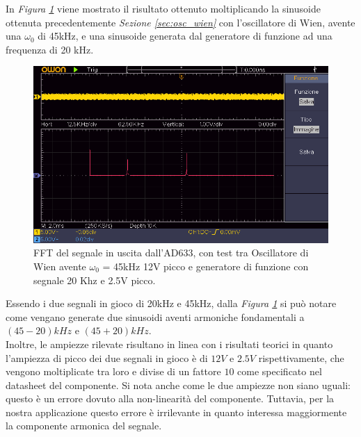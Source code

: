 \documentclass[titlepage]{report}
\begin{document}
	\noindent In \textit{Figura \ref{fig:FFTmixer}} viene mostrato il risultato ottenuto moltiplicando la sinusoide ottenuta precedentemente \textit{Sezione \ref{sec:osc_wien}} con l'oscillatore di Wien, avente una $\omega_0$ di 45kHz, e una sinusoide generata dal generatore di funzione ad una frequenza di 20 kHz.

	\begin{figure}[H]
		\centering
		\includegraphics[scale=0.9]{Immagini/uscita_ad633_con_fcngen_20k_e_osc_45k.png}
		\caption{FFT del segnale in uscita dall'AD633, con test tra Oscillatore di Wien avente $\omega_0$ = 45kHz 12V picco e generatore di funzione con segnale 20 Khz e 2.5V picco.}
		\label{fig:FFTmixer}
	\end{figure}
	
	 \noindent Essendo i due segnali in gioco di 20kHz e 45kHz, dalla  \textit{Figura \ref{fig:FFTmixer}} si può notare come vengano generate due sinusoidi aventi armoniche fondamentali a $(45-20)kHz$ e $(45+20)kHz$. %
	 \\
	 Inoltre, le ampiezze rilevate risultano in linea con i risultati teorici in quanto l'ampiezza di picco dei due segnali in gioco è di $12V$ e $2.5V$ rispettivamente, che vengono moltiplicate tra loro e divise di un fattore $10$ come specificato nel datasheet del componente. Si nota anche come le due ampiezze non siano uguali: questo è un errore dovuto alla non-linearità del componente. Tuttavia, per la nostra applicazione questo errore è irrilevante in quanto interessa maggiormente la componente armonica del segnale.
	
\end{document}
